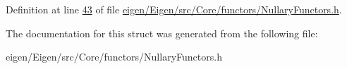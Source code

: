 Definition at line \hyperlink{eigen_2_eigen_2src_2_core_2functors_2_nullary_functors_8h_source_l00043}{43} of file \hyperlink{eigen_2_eigen_2src_2_core_2functors_2_nullary_functors_8h_source}{eigen/\+Eigen/src/\+Core/functors/\+Nullary\+Functors.\+h}.



The documentation for this struct was generated from the following file\+:\begin{DoxyCompactItemize}
\item 
eigen/\+Eigen/src/\+Core/functors/\+Nullary\+Functors.\+h\end{DoxyCompactItemize}
